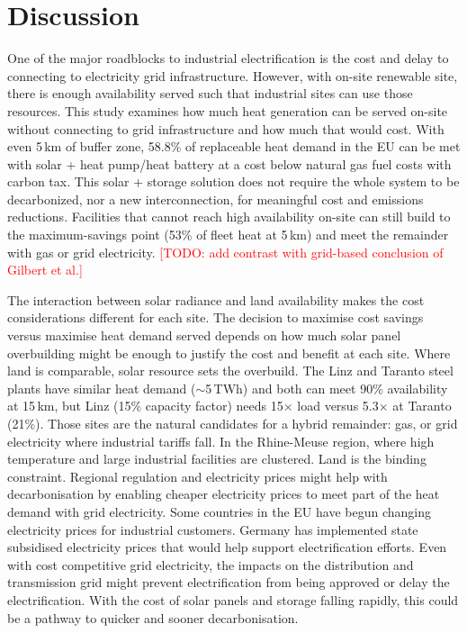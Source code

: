 \documentclass[11pt]{article}
\newcommand{\todo}[1]{\textcolor{red}{[TODO: #1]}}
\begin{document}
\section*{Discussion}
One of the major roadblocks to industrial electrification is the cost and delay to connecting to electricity grid infrastructure. However, with on-site renewable site, there is enough availability served such that industrial sites can use those resources. This study examines how much heat generation can be served on-site without connecting to grid infrastructure and how much that would cost. With even 5\,km of buffer zone, 58.8\% of replaceable heat demand in the EU can be met with solar + heat pump/heat battery at a cost below natural gas fuel costs with carbon tax. This solar + storage solution does not require the whole system to be decarbonized, nor a new interconnection, for meaningful cost and emissions reductions. Facilities that cannot reach high availability on-site can still build to the maximum-savings point (53\% of fleet heat at 5\,km) and meet the remainder with gas or grid electricity.
\todo{add contrast with grid-based conclusion of Gilbert et al.\cite{gilbert2023lcoh}}

The interaction between solar radiance and land availability makes the cost considerations different for each site. The decision to maximise cost savings versus maximise heat demand served depends on how much solar panel overbuilding might be enough to justify the cost and benefit at each site. Where land is comparable, solar resource sets the overbuild. The Linz and Taranto steel plants have similar heat demand ($\sim$5\,TWh) and both can meet 90\% availability at 15\,km, but Linz (15\% capacity factor) needs 15$\times$ load versus 5.3$\times$ at Taranto (21\%). Those sites are the natural candidates for a hybrid remainder: gas, or grid electricity where industrial tariffs fall. In the Rhine-Meuse region, where high temperature and large industrial facilities are clustered. Land is the binding constraint. Regional regulation and electricity prices might help with decarbonisation by enabling cheaper electricity prices to meet part of the heat demand with grid electricity. Some countries in the EU have begun changing electricity prices for industrial customers. Germany has implemented state subsidised electricity prices that would help support electrification efforts\cite{wiedemann2026kpmg}. Even with cost competitive grid electricity, the impacts on the distribution and transmission grid might prevent electrification from being approved or delay the electrification. With the cost of solar panels and storage falling rapidly, this could be a pathway to quicker and sooner decarbonisation.
\end{document}
